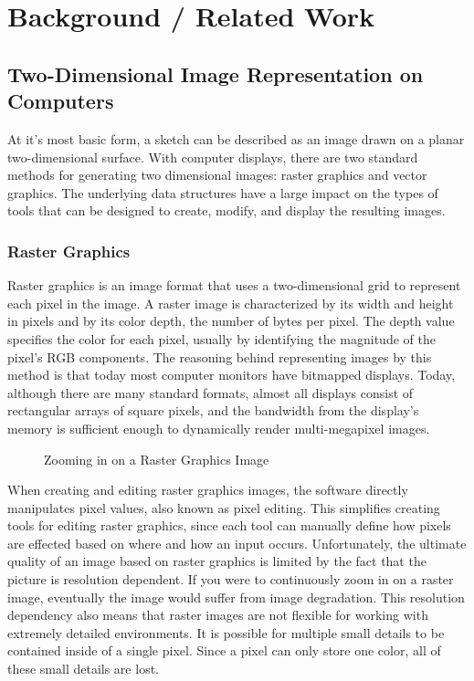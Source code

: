 \chapter{Background / Related Work}

\section{Two-Dimensional Image Representation on Computers}
\label{sec:2dimages}

At it's most basic form, a sketch can be described as an image drawn on a planar two-dimensional surface.
With computer displays, there are two standard methods for generating two dimensional images: raster graphics and vector graphics.
The underlying data structures  have a large impact on the types of tools that can be designed to create, modify, and display the resulting images.

\subsection{Raster Graphics}

Raster graphics is an image format that uses a two-dimensional grid to represent each pixel in the image. 
A raster image is characterized by its width and height in pixels and by its color depth, the number of bytes per pixel. 
The depth value specifies the color for each pixel, usually by identifying the magnitude of the pixel's RGB components. 
The reasoning behind representing images by this method is that today most computer monitors have bitmapped displays. 
Today, although there are many standard formats, almost all displays consist of rectangular arrays of square pixels, and the bandwidth from the display's memory is sufficient enough to dynamically render multi-megapixel images. 
\begin{figure}
\caption{Zooming in on a Raster Graphics Image \autocite{printingcollection}}
\end{figure}



When creating and editing raster graphics images, the software directly manipulates pixel values, also known as pixel editing.
This simplifies creating tools for editing raster graphics, since each tool can manually define how pixels are effected based on where and how an input occurs. 
Unfortunately, the ultimate quality of an image based on raster graphics is limited by the fact that the picture is resolution dependent. 
If you were to continuously zoom in on a raster image, eventually the image would suffer from image degradation. 
This resolution dependency also means that raster images are not flexible for working with extremely detailed environments.
It is possible for multiple small details to be contained inside of a single pixel.
Since a pixel can only store one color, all of these small details are lost.

